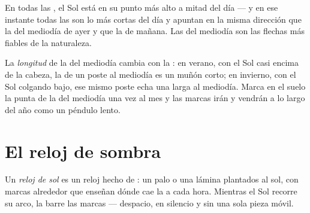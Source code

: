 \begin{proposition}\label{prop:g3:sun-days-seasons:midday}
En todas las , el Sol está en su punto más alto a mitad
del día --- y en ese instante todas las  son lo más cortas del
día y apuntan en la misma dirección que la  del mediodía de
ayer y que la de mañana. Las  del mediodía son las flechas
más fiables de la naturaleza.
\end{proposition}

\begin{example}\label{ex:g3:sun-days-seasons:shadowlength}
La \emph{longitud} de la  del mediodía cambia con la
: en verano, con el Sol casi encima de la cabeza, la
 de un poste al mediodía es un muñón corto; en invierno, con el
Sol colgando bajo, ese mismo poste echa una  larga al mediodía.
Marca en el suelo la punta de la  del mediodía una vez al mes y
las marcas irán y vendrán a lo largo del año como un péndulo lento.
\end{example}

\section{El reloj de sombra}

\begin{definition}\label{def:g3:sun-days-seasons:sundial}
Un \emph{reloj de sol} es un reloj hecho de
: un palo o una lámina plantados al sol, con marcas
alrededor que enseñan dónde cae la  a cada hora. Mientras el Sol
recorre su arco, la  barre las marcas --- despacio, en silencio
y sin una sola pieza móvil.
\end{definition}

